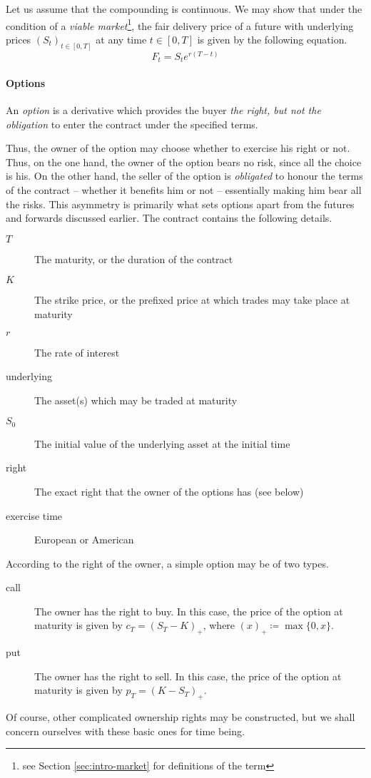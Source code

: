 Let us assume that the compounding is continuous. We may show that under the condition of a \emph{viable market}\footnote{see Section \ref{sec:intro-market} for definitions of the term}, the fair delivery price of a future with underlying prices $ ( S_t )_{t \in [0, T] } $ at any time $ t \in [0, T] $ is given by the following equation.
\begin{equation}
	\label{eq:intro-future-pr}
	F_t = S_t e^{ r (T - t) }
\end{equation}


\paragraph{Options}

\begin{dfn}[option]
	An \emph{option} is a derivative which provides the buyer \emph{the right, but not the obligation} to enter the contract under the specified terms.
\end{dfn}

Thus, the owner of the option may choose whether to exercise his right or not. Thus, on the one hand, the owner of the option bears no risk, since all the choice is his. On the other hand, the seller of the option is \emph{obligated} to honour the terms of the contract -- whether it benefits him or not -- essentially making him bear all the risks. This asymmetry is primarily what sets options apart from the futures and forwards discussed earlier.
The contract contains the following details.
\begin{description}
	\item[$ T $] The maturity, or the duration of the contract
	\item[$ K $] The strike price, or the prefixed price at which trades may take place at maturity
	\item[$ r $] The rate of interest
	\item[underlying] The asset(s) which may be traded at maturity
	\item[$ S_0 $] The initial value of the underlying asset at the initial time
	\item[right] The exact right that the owner of the options has (see below)
	\item[exercise time] European or American
\end{description}

According to the right of the owner, a simple option may be of two types.
\begin{description}
	\item[call] The owner has the right to buy. In this case, the price of the option at maturity is given by $ c_T = (S_T - K)_+ $, where $ (x)_+ \coloneqq \max \{ 0, x \} $.
	\item[put] The owner has the right to sell. In this case, the price of the option at maturity is given by $ p_T = (K - S_T)_+ $.
\end{description}
Of course, other complicated ownership rights may be constructed, but we shall concern ourselves with these basic ones for time being.


